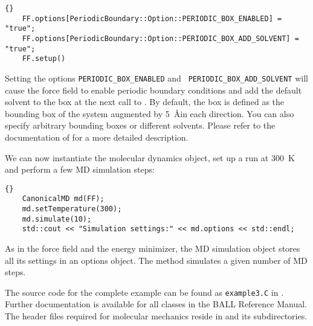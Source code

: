 \begin{lstlisting}{}
	FF.options[PeriodicBoundary::Option::PERIODIC_BOX_ENABLED] = "true";
	FF.options[PeriodicBoundary::Option::PERIODIC_BOX_ADD_SOLVENT] = "true";
	FF.setup()
\end{lstlisting}

\noindent
Setting the options {\tt PERIODIC\_BOX\_ENABLED} and {\tt
PERIODIC\_BOX\_ADD\_SOLVENT} will cause the force field to enable periodic
boundary conditions and add the default solvent to the box at the next call
to . By default, the box is defined as the bounding box of the
system augmented by 5~\AA in each direction. You can also specify arbitrary
bounding boxes or different solvents. Please refer to the documentation of
 for a more detailed description.

We can now instantiate the molecular dynamics object, set up a run at 300~K and
perform a few  MD simulation steps:

\begin{lstlisting}{}
	CanonicalMD md(FF);
	md.setTemperature(300);
	md.simulate(10);
	std::cout << "Simulation settings:" << md.options << std::endl;
\end{lstlisting}

\noindent
As in the force field and the energy minimizer, the MD simulation object
stores all its settings in an options object. The
 method simulates a given number of MD
steps. 

The source code for the complete example can be found as {\tt example3.C}
in . Further documentation is available for all
classes in the BALL Reference Manual. The header files required for molecular
mechanics reside in  and its subdirectories.

